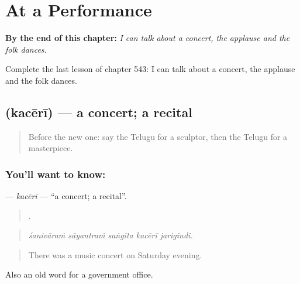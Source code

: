 
\chapter{At a Performance}
\label{ch:te-at-a-performance}

\begin{chapteropening}
\textbf{By the end of this chapter:} \emph{I can talk about a concert, the applause and the folk dances.}

Complete the last lesson of chapter 543: I can talk about a concert, the applause and the folk dances.
\end{chapteropening}

\section[\texorpdfstring{\te{కచేరీ} (kacērī)}{కచేరీ (kacērī)}]{ (kacērī) — a concert; a recital}

\label{lesson:TE-C543-kaceri}



\begin{quote}
Before the new one: say the Telugu for a sculptor, then the Telugu for a masterpiece.
\end{quote}

\subsection*{You'll want to know: }
\textbf{} — \emph{kacērī} — \textquotedblleft{}a concert; a recital\textquotedblright{}.

\begin{quote}
    .
\end{quote}

\begin{quote}
\emph{śanivāraṁ sāyantraṁ saṅgīta kacērī jarigindi.}
\end{quote}

\begin{quote}
There was a music concert on Saturday evening.
\end{quote}

Also an old word for a government office.

